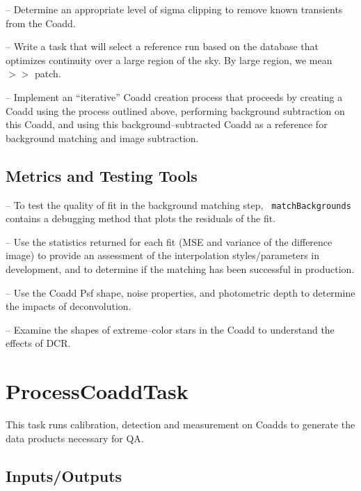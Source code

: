 \documentclass[prd, nofootinbib, floatfix, 11pt,tightenlines,times]{article}
\begin{document}
-- Determine an appropriate level of sigma clipping to remove known
transients from the Coadd.

-- Write a task that will select a reference run based on the database
that optimizes continuity over a large region of the sky.  By large
region, we mean $>>$ patch.

-- Implement an ``iterative'' Coadd creation process that proceeds by
creating a Coadd using the process outlined above, performing
background subtraction on this Coadd, and using this
background--subtracted Coadd as a reference for background matching
and image subtraction.

\subsection{Metrics and Testing Tools}

-- To test the quality of fit in the background matching step, {\tt
  matchBackgrounds} contains a debugging method that plots the
residuals of the fit.

-- Use the statistics returned for each fit (MSE and variance of the
difference image) to provide an assessment of the interpolation
styles/parameters in development, and to determine if the matching has
been successful in production.

-- Use the Coadd Psf shape, noise properties, and photometric depth to
determine the impacts of deconvolution.

-- Examine the shapes of extreme--color stars in the Coadd to
understand the effects of DCR.



\section{ProcessCoaddTask} 
This task runs calibration, detection and measurement on Coadds to
generate the data products necessary for QA.  




\subsection{Inputs/Outputs}
\end{document}
